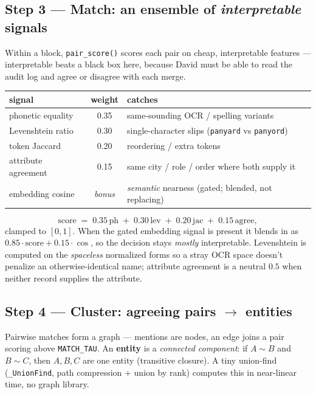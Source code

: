 \documentclass[11pt]{article}
\newcommand{\code}[1]{\texttt{#1}}
\begin{document}
\subsection{Step 3 --- Match: an ensemble of \emph{interpretable} signals}

Within a block, \code{pair\_score()} scores each pair on cheap, interpretable
features --- interpretable beats a black box here, because David must be able to
read the audit log and agree or disagree with each merge.

\begin{center}
\small
\begin{tabular}{lcl}
\toprule
signal & weight & catches \\
\midrule
phonetic equality      & 0.35 & same-sounding OCR / spelling variants \\
Levenshtein ratio      & 0.30 & single-character slips (\texttt{panyard} vs \texttt{panyord}) \\
token Jaccard          & 0.20 & reordering / extra tokens \\
attribute agreement    & 0.15 & same city / role / order where both supply it \\
embedding cosine       & \emph{bonus} & \emph{semantic} nearness (gated; blended, not replacing) \\
\bottomrule
\end{tabular}
\end{center}

\[
\text{score} \;=\; 0.35\,\mathrm{ph} \;+\; 0.30\,\mathrm{lev} \;+\;
0.20\,\mathrm{jac} \;+\; 0.15\,\mathrm{agree},
\]
clamped to $[0,1]$. When the gated embedding signal is present it blends in as
$0.85\cdot\text{score} + 0.15\cdot\cos$, so the decision stays \emph{mostly}
interpretable. Levenshtein is computed on the \emph{spaceless} normalized forms so
a stray OCR space doesn't penalize an otherwise-identical name; attribute agreement
is a neutral $0.5$ when neither record supplies the attribute.

\subsection{Step 4 --- Cluster: agreeing pairs $\to$ entities}

Pairwise matches form a graph --- mentions are nodes, an edge joins a pair scoring
above \code{MATCH\_TAU}. An \textbf{entity} is a \emph{connected component}: if
$A\!\sim\!B$ and $B\!\sim\!C$, then $A,B,C$ are one entity (transitive closure). A
tiny union-find (\code{\_UnionFind}, path compression + union by rank) computes this
in near-linear time, no graph library.
\end{document}
